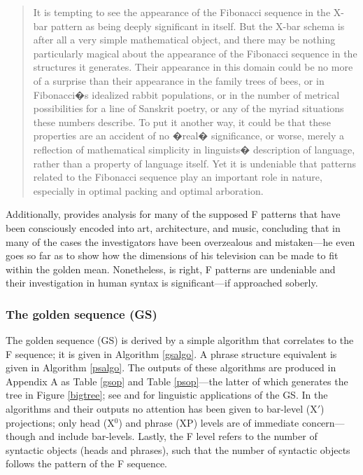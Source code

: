 \documentclass[11pt,twoside]{article}
\theoremstyle{plain}
\numberwithin{equation}{section}
\theoremstyle{definition}
\newtheorem{phrase string}{Phrase String}
\begin{document}
\begin{quotation}It is tempting to see the appearance of the Fibonacci sequence in the X-bar pattern as being deeply significant in itself. But the X-bar schema is after all a very simple mathematical object, and there may be nothing particularly magical about the appearance of the Fibonacci sequence in the structures it generates. Their appearance in this domain could be no more of a surprise than their appearance in the family trees of bees, or in Fibonacci�s idealized rabbit populations, or in the number of metrical possibilities for a line of Sanskrit poetry, or any of the myriad situations these numbers describe. To put it another way, it could be that these properties are an accident of no �real� significance, or worse, merely a reflection of mathematical simplicity in linguists� description of language, rather than a property of language itself. Yet it is undeniable that patterns related to the Fibonacci sequence play an important role in nature, especially in optimal packing and optimal arboration.\end{quotation}

Additionally, \cite{livio:2002} provides analysis for many of the supposed F patterns that have been consciously encoded into art, architecture, and music, concluding that in many of the cases the investigators have been overzealous and mistaken---he even goes so far as to show how the dimensions of his television can be made to fit within the golden mean. Nonetheless, \cite{medeiros:2008} is right, F patterns are undeniable and their investigation in human syntax is significant---if approached soberly.

\subsubsection{The golden sequence (GS)}
The golden sequence (GS) is derived by a simple algorithm that correlates to the F sequence; it is given in Algorithm \ref{gsalgo}. A phrase structure equivalent is given in Algorithm \ref{psalgo}. The outputs of these algorithms are produced in Appendix A as Table \ref{gsop} and Table \ref{psop}---the latter of which generates the tree in Figure \ref{bigtree}; see \cite{uriagereka:1998} and \cite{ppuriagereka:2008} for linguistic applications of the GS. In the algorithms and their outputs no attention has been given to bar-level (X$'$) projections; only head (X$^0$) and phrase (XP) levels are of immediate concern---though \cite{medeiros:2008} and \cite{soschen:2008} include bar-levels. Lastly, the F level refers to the number of syntactic objects (heads and phrases), such that the number of syntactic objects follows the pattern of the F sequence. 
\end{document}
